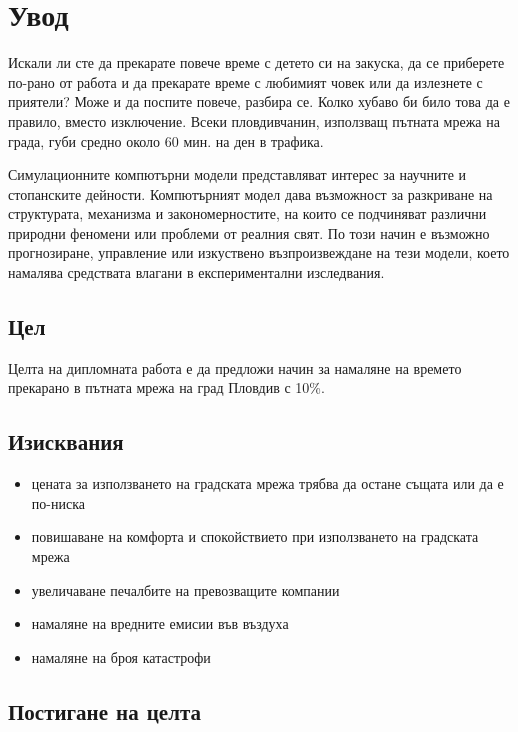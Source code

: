 \chapter{Увод}

	Искали ли сте да прекарате повече време с детето си на закуска, 
	да се приберете по-рано от работа и да прекарате време с любимият човек или да излезнете с приятели? 
	Може и да поспите повече, разбира се. Колко хубаво би било това да е правило, вместо изключение.
	Всеки пловдивчанин, използващ пътната мрежа на града, губи средно около 60 мин. на ден в трафика.
	
	Симулационните компютърни модели представляват интерес за научните и
	стопанските дейности. Компютърният модел дава възможност за разкриване на структурата,
	механизма и закономерностите, на които се подчиняват различни природни феномени или
	проблеми от реалния свят. По този начин е възможно прогнозиране, управление или
	изкуствено възпроизвеждане на тези модели, което намалява средствата влагани в
	експериментални изследвания. \cite{Iliev}

	\section{Цел}

	Целта на дипломната работа е да предложи начин за намаляне на времето прекарано в пътната мрежа на град Пловдив с 10\%. 

	\section{Изисквания}

		\begin{itemize}
			\item цената за използването на градската мрежа трябва да остане същата или да е по-ниска
			\item повишаване на комфорта и спокойствието при използването на градската мрежа
			\item увеличаване печалбите на превозващите компании
			\item намаляне на вредните емисии във въздуха
			\item намаляне на броя катастрофи
		\end{itemize}

	\section{Постигане на целта}

